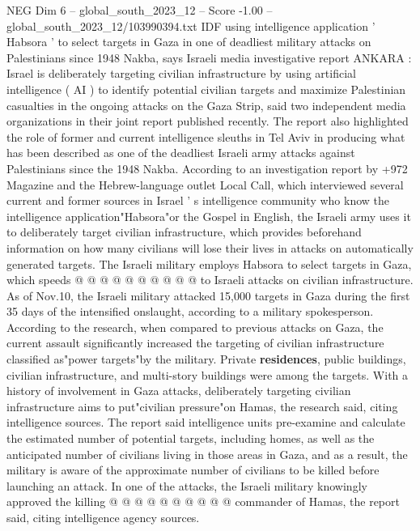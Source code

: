 \begin{textsample}{NEG Dim 6 – global\_south\_2023\_12 – Score -1.00 – global\_south\_2023\_12/103990394.txt}  \label{ex:f6_neg_348}
IDF using intelligence application ' Habsora ' to select targets in Gaza in one of deadliest military attacks on Palestinians since 1948 Nakba, says Israeli media investigative report ANKARA : Israel is deliberately targeting civilian infrastructure by using artificial intelligence ( AI ) to identify potential civilian targets and maximize Palestinian casualties in the ongoing attacks on the Gaza Strip, said two independent media organizations in their joint report published recently.
The report also highlighted the role of former and current intelligence sleuths in Tel Aviv in producing what has been described as one of the deadliest Israeli army attacks against Palestinians since the 1948 Nakba.
According to an investigation report by +972 Magazine and the Hebrew-language outlet Local Call, which interviewed several current and former sources in Israel ' s intelligence community who know the intelligence application"Habsora"or the Gospel in English, the Israeli army uses it to deliberately target civilian infrastructure, which provides beforehand information on how many civilians will lose their lives in attacks on automatically generated targets.
The Israeli military employs Habsora to select targets in Gaza, which speeds @ @ @ @ @ @ @ @ @ @ to Israeli attacks on civilian infrastructure.
As of Nov.10, the Israeli military attacked 15,000 targets in Gaza during the first 35 days of the intensified onslaught, according to a military spokesperson.
According to the research, when compared to previous attacks on Gaza, the current assault significantly increased the targeting of civilian infrastructure classified as"power targets"by the military.
Private \textbf{residences}, public buildings, civilian infrastructure, and multi-story buildings were among the targets.
With a history of involvement in Gaza attacks, deliberately targeting civilian infrastructure aims to put"civilian pressure"on Hamas, the research said, citing intelligence sources.
The report said intelligence units pre-examine and calculate the estimated number of potential targets, including homes, as well as the anticipated number of civilians living in those areas in Gaza, and as a result, the military is aware of the approximate number of civilians to be killed before launching an attack.
In one of the attacks, the Israeli military knowingly approved the killing @ @ @ @ @ @ @ @ @ @ commander of Hamas, the report said, citing intelligence agency sources.

\end{textsample}
